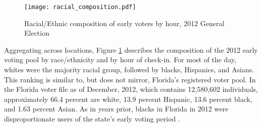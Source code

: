 \documentclass[12pt,titlepage]{article}
\begin{document}



\begin{figure}[!ht]
\caption{Racial/Ethnic composition of early voters by hour, 2012 General Election}
  \label{fig:race2012}
  \centering
    \centering\texttt{[image: racial\_composition.pdf]}
\end{figure}

Aggregating across locations, Figure \ref{fig:race2012} describes the
composition of the 2012 early voting pool by race/ethnicity and by hour of
check-in.  For most of the day, whites were the majority racial group,
followed by blacks, Hispanics, and Asians.  This ranking is similar
to, but does not mirror, Florida's registered voter pool.  In the
Florida voter file as of December, 2012, which contains 12,580,602
individuals, approximately 66.4 percent are white, 13.9 percent
Hispanic, 13.6 percent black, and 1.63 percent Asian.  As in years
prior, blacks in Florida in 2012 were disproportionate users of the
state's early voting period \citep{herronsmith:souls}.




\end{document}
